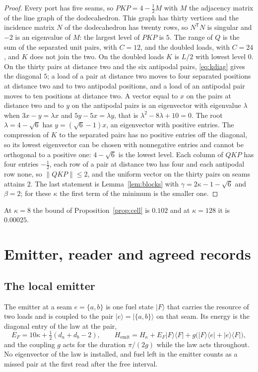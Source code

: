 \documentclass[11pt]{article}
\theoremstyle{definition}
\theoremstyle{remark}
\theoremstyle{plain}
\newcommand{\ket}[1]{\lvert #1\rangle}
\newcommand{\bra}[1]{\langle #1\rvert}
\newcommand{\proj}[1]{\lvert #1\rangle\langle #1\rvert}
\begin{document}
\begin{proof}
Every port has five seams, so $PKP=4-\tfrac12M$ with $M$ the adjacency
matrix of the line graph of the dodecahedron. This graph has thirty
vertices and the incidence matrix $N$ of the dodecahedron has twenty rows,
so $N^{\mathsf T}N$ is singular and $-2$ is an eigenvalue of $M$: the
largest level of $PKP$ is $5$. The range of $Q$ is the sum of the separated
unit pairs, with $C=12$, and the doubled loads, with $C=24$, and $K$ does
not join the two. On the doubled loads $K$ is $L/2$ with lowest level $0$.
On the thirty pairs at distance two and the six antipodal pairs,
\eqref{eq:kdiag} gives the diagonal $5$; a load of a pair at distance two
moves to four separated positions at distance two and to two antipodal
positions, and a load of an antipodal pair moves to ten positions at
distance two. A vector equal to $x$ on the pairs at distance two and to $y$
on the antipodal pairs is an eigenvector with eigenvalue $\lambda$ when
$3x-y=\lambda x$ and $5y-5x=\lambda y$, that is
$\lambda^{2}-8\lambda+10=0$. The root $\lambda=4-\sqrt6$ has
$y=(\sqrt6-1)x$, an eigenvector with positive entries. The compression of
$K$ to the separated pairs has no positive entries off the diagonal, so its
lowest eigenvector can be chosen with nonnegative entries and cannot be
orthogonal to a positive one: $4-\sqrt6$ is the lowest level. Each column
of $QKP$ has four entries $-\tfrac12$, each row of a pair at distance two
has four and each antipodal row none, so $\lVert QKP\rVert\le2$, and the
uniform vector on the thirty pairs on seams attains $2$. The last statement
is Lemma~\ref{lem:blocks} with $\gamma=2\kappa-1-\sqrt6$ and $\beta=2$; for
these $\kappa$ the first term of the minimum is the smaller one.
\end{proof}

At $\kappa=8$ the bound of Proposition~\ref{prop:cell} is $0.102$ and at
$\kappa=128$ it is $0.00025$.


\section{Emitter, reader and agreed records}
\label{sec:instruments}

\subsection{The local emitter}

The emitter at a seam $e=\{a,b\}$ is one fuel state $\ket{F}$ that carries
the resource of two loads and is coupled to the pair $\ket{e}=\ket{\{a,b\}}$
on that seam. Its energy is the diagonal entry of the law at the pair,
\begin{equation}
E_F=10\kappa+\tfrac12(d_a+d_b-2),\qquad
H_{\mathrm{emit}}=H_\kappa+E_F\proj{F}+g\bigl(\ket{F}\bra{e}+\ket{e}\bra{F}\bigr),
\label{eq:emitter}
\end{equation}
and the coupling $g$ acts for the duration $\pi/(2g)$ while the law acts
throughout. No eigenvector of the law is installed, and fuel left in the
emitter counts as a missed pair at the first read after the free interval.
\end{document}
